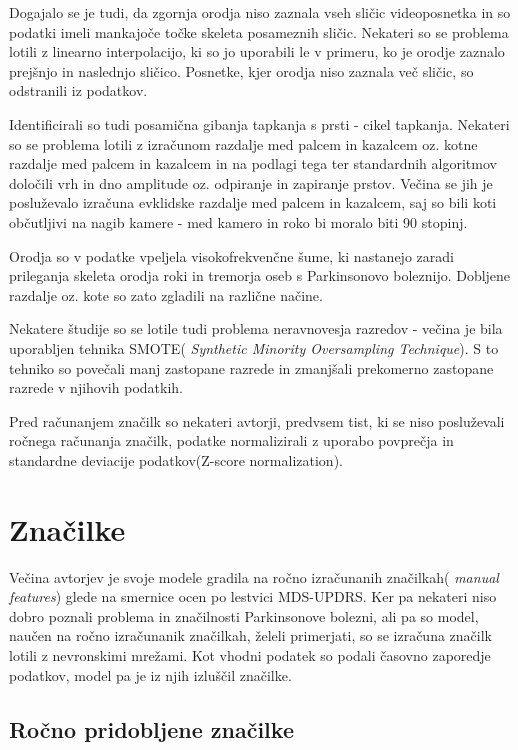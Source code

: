 \documentclass[
]{article}
\begin{document}
Dogajalo se je tudi, da zgornja orodja niso zaznala vseh sličic
videoposnetka in so podatki imeli mankajoče točke skeleta posameznih
sličic. Nekateri so se problema lotili z linearno interpolacijo, ki so
jo uporabili le v primeru, ko je orodje zaznalo prejšnjo in naslednjo
sličico. Posnetke, kjer orodja niso zaznala več sličic, so odstranili iz
podatkov.

Identificirali so tudi posamična gibanja tapkanja s prsti - cikel
tapkanja. Nekateri so se problema lotili z izračunom razdalje med palcem
in kazalcem oz. kotne razdalje med palcem in kazalcem in na podlagi tega
ter standardnih algoritmov določili vrh in dno amplitude oz. odpiranje
in zapiranje prstov. Večina se jih je posluževalo izračuna evklidske
razdalje med palcem in kazalcem, saj so bili koti občutljivi na nagib
kamere - med kamero in roko bi moralo biti 90 stopinj.

Orodja so v podatke vpeljela visokofrekvenčne šume, ki nastanejo zaradi
prileganja skeleta orodja roki in tremorja oseb s Parkinsonovo
boleznijo. Dobljene razdalje oz. kote so zato zgladili na različne
načine.

Nekatere študije so se lotile tudi problema neravnovesja razredov -
večina je bila uporabljen tehnika SMOTE( \emph{Synthetic Minority
Oversampling Technique}). S to tehniko so povečali manj zastopane
razrede in zmanjšali prekomerno zastopane razrede v njihovih podatkih.

Pred računanjem značilk so nekateri avtorji, predvsem tist, ki se niso
posluževali ročnega računanja značilk, podatke normalizirali z uporabo
povprečja in standardne deviacije podatkov(Z-score normalization).

\section{Značilke}\label{znaux10dilke}

Večina avtorjev je svoje modele gradila na ročno izračunanih značilkah(
\emph{manual features}) glede na smernice ocen po lestvici MDS-UPDRS.
Ker pa nekateri niso dobro poznali problema in značilnosti Parkinsonove
bolezni, ali pa so model, naučen na ročno izračunanik značilkah, želeli
primerjati, so se izračuna značilk lotili z nevronskimi mrežami. Kot
vhodni podatek so podali časovno zaporedje podatkov, model pa je iz njih
izluščil značilke.

\subsection{Ročno pridobljene
značilke}\label{roux10dno-pridobljene-znaux10dilke}
\end{document}
